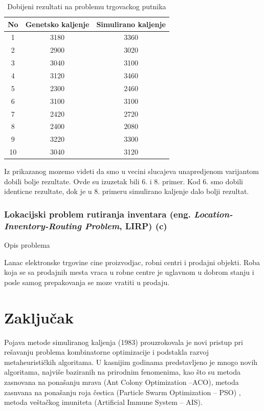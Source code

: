 \documentclass[a4paper]{article}
\begin{document}
\begin{table}[ht]
\begin{center}
\begin{tabular}{|c|c|c|} \hline
     No & Genetsko kaljenje & Simulirano kaljenje  \\ \hline
     1 &  3180 & 3360 \\ \hline
     2 &  2900 & 3020 \\ \hline
     3 &  3040 & 3100 \\ \hline
     4 &  3120 & 3460 \\ \hline
     5 &  2300 & 2460 \\ \hline
     6 &  3100 & 3100 \\ \hline
     7 &  2420 & 2720 \\ \hline
     8 &  2400 & 2080 \\ \hline
     9 &  3220 & 3300 \\ \hline
     10 & 3040 & 3120 \\ \hline
\end{tabular}
\end{center}
\label{tabela:1}
\caption{Dobijeni rezultati na problemu trgovackog putnika}
\end{table}
Iz prikazanog mozemo videti da smo u vecini slucajeva unapredjenom varijantom dobili bolje rezultate. Ovde su izuzetak bili 6. i 8. primer. Kod 6. smo dobili identicne rezultate, dok je u 8. primeru simulirano kaljenje dalo bolji rezultat.

\subsubsection{Lokacijski problem rutiranja inventara (eng. \textit{Location-Inventory-Routing Problem}, LIRP) (c)}
\newpage
\large{Opis problema} \\ \normalsize

Lanac elektronske trgovine cine proizvodjac, robni centri i prodajni objekti. Roba koja se sa prodajnih mesta vraca u robne centre je uglavnom u dobrom stanju i posle samog prepakovanja se moze vratiti u prodaju. 



\section{Zaključak}
\label{sec:zakljucak}

Pojava metode simuliranog kaljenja (1983) prouzrokovala je novi pristup pri rešavanju
problema kombinatorne optimizacije i podstakla razvoj metaheurističkih algoritama. U kasnijim godinama predstavljeno je mnogo novih algoritama, najviše baziranih na prirodnim
fenomenima, kao što su metoda zasnovana na ponašanju mrava (Ant Colony Optimization –ACO), metoda zasnvana na ponašanju roja čestica (Particle Swarm Optimization –
PSO) , metoda veštačkog imuniteta (Artificial Immune System – AIS).


\appendix
 


\appendix
\end{document}

